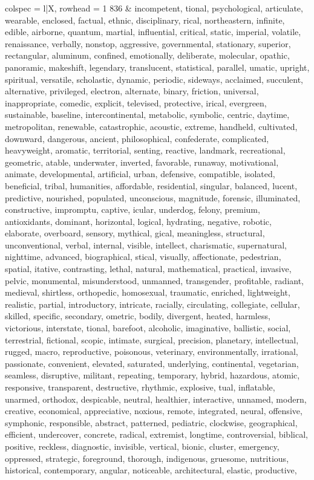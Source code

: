 \begin{tblr}[
  long,
  caption = {Examples from SNLI.},
  entry = {Short Caption},
  label = {tblr:test},
]{
colspec = {l|X},
rowhead = 1}
836 & incompetent, tional, psychological, articulate, wearable, enclosed, factual, ethnic, disciplinary, rical, northeastern, infinite, edible, airborne, quantum, martial, influential, critical, static, imperial, volatile, renaissance, verbally, nonstop, aggressive, governmental, stationary, superior, rectangular, aluminum, confined, emotionally, deliberate, molecular, opathic, panoramic, makeshift, legendary, translucent, statistical, parallel, umatic, upright, spiritual, versatile, scholastic, dynamic, periodic, sideways, acclaimed, succulent, alternative, privileged, electron, alternate, binary, friction, universal, inappropriate, comedic, explicit, televised, protective, irical, evergreen, sustainable, baseline, intercontinental, metabolic, symbolic, centric, daytime, metropolitan, renewable, catastrophic, acoustic, extreme, handheld, cultivated, downward, dangerous, ancient, philosophical, confederate, complicated, heavyweight, aromatic, territorial, senting, reactive, landmark, recreational, geometric, atable, underwater, inverted, favorable, runaway, motivational, animate, developmental, artificial, urban, defensive, compatible, isolated, beneficial, tribal, humanities, affordable, residential, singular, balanced, lucent, predictive, nourished, populated, unconscious, magnitude, forensic, illuminated, constructive, impromptu, captive, icular, underdog, felony, premium, antioxidants, dominant, horizontal, logical, hydrating, negative, robotic, elaborate, overboard, sensory, mythical, gical, meaningless, structural, unconventional, verbal, internal, visible, intellect, charismatic, supernatural, nighttime, advanced, biographical, stical, visually, affectionate, pedestrian, spatial, itative, contrasting, lethal, natural, mathematical, practical, invasive, pelvic, monumental, misunderstood, unmanned, transgender, profitable, radiant, medieval, shirtless, orthopedic, homosexual, traumatic, enriched, lightweight, realistic, partial, introductory, intricate, racially, circulating, collegiate, cellular, skilled, specific, secondary, ometric, bodily, divergent, heated, harmless, victorious, interstate, tional, barefoot, alcoholic, imaginative, ballistic, social, terrestrial, fictional, scopic, intimate, surgical, precision, planetary, intellectual, rugged, macro, reproductive, poisonous, veterinary, environmentally, irrational, passionate, convenient, elevated, saturated, underlying, continental, vegetarian, seamless, disruptive, militant, repeating, temporary, hybrid, hazardous, atomic, responsive, transparent, destructive, rhythmic, explosive, tual, inflatable, unarmed, orthodox, despicable, neutral, healthier, interactive, unnamed, modern, creative, economical, appreciative, noxious, remote, integrated, neural, offensive, symphonic, responsible, abstract, patterned, pediatric, clockwise, geographical, efficient, undercover, concrete, radical, extremist, longtime, controversial, biblical, positive, reckless, diagnostic, invisible, vertical, bionic, cluster, emergency, oppressed, strategic, foreground, thorough, indigenous, gruesome, nutritious, historical, contemporary, angular, noticeable, architectural, elastic, productive, 
\end{tblr}
